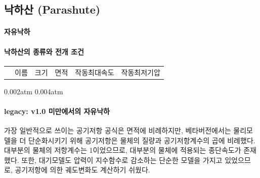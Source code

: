 \documentclass[9pt]{amsbook}
\begin{document}
\subsection{낙하산 (Parashute)}
\paragraph{자유낙하}

\paragraph{낙하산의 종류와 전개 조건}
\begin{tabular}{|ll|r|r|r|r|}
&이름&크기&면적&작동최대속도&작동최저기압
\\
\end{tabular}

0.002atm 0.004atm

\paragraph{legacy: v1.0 미만에서의 자유낙하}
가장 일반적으로 쓰이는 공기저항 공식은 면적에 비례하지만, 
베타버전에서는 물리모델을 더 단순화시키기 위해 공기저항은 물체의 질량과 공기저항계수의 곱에 비례했다.
대부분의 물체의 저항계수는 1이었으므로,
대부분의 물체에 적용되는 종단속도가 존재했다.
또한, 대기모델도 압력이 지수함수로 감소하는 단순한 모델을 가지고 있었으므로,
공기저항에 의한 궤도변화도 계산하기 쉬웠다.
\end{document}
